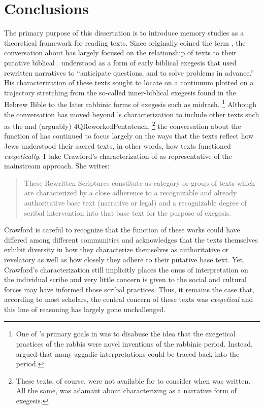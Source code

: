 
\chapter*{Conclusions}


The primary purpose of this dissertation is to introduce memory studies as a theoretical framework for reading \rwb texts. Since \Vermes originally coined the term \rwb, the conversation about \rwb has largely focused on the relationship of \rwb texts to their putative biblical \vorlagen. \vermes understood \rwb as a form of early biblical exegesis that used rewritten narratives to ``anticipate questions, and to solve problems in advance.''%
    \autocite[95]{vermes1961}
His characterization of these texts sought to locate \rwb on a continuum plotted on a trajectory stretching from the so-called inner-biblical exegesis found in the Hebrew Bible to the later rabbinic forms of exegesis such as midrash.%
    \footnote{One of \vermes's primary goals in  was to disabuse the idea that the exegetical practices of the rabbis were novel inventions of the rabbinic period. Instead, \vermes argued that many aggadic interpretations could be traced back into the \secondtemple period.}
Although the conversation has moved beyond \vermes's characterization to include other texts such as the \templescroll and (arguably) 4QReworkedPentateuch,%
    \footnote{These texts, of course, were not available for \vermes to consider when  was written. All the same, \vermes was adamant about characterizing \rwb as a narrative form of exegesis.}    
the conversation about the function of \rwb has continued to focus largely on the ways that the \rwb texts reflect how \secondtemple Jews understood their sacred texts, in other words, how \rwb texts functioned \emph{exegetically}. I take Crawford's characterization of  \rwb as representative of the mainstream approach. She writes:
\begin{quote}
    These Rewritten Scriptures constitute as category or group of texts which are characterized by a close adherence to a recognizable and already authoritative base text (narrative or legal) and a recognizable degree of scribal intervention into that base text for the purpose of exegesis.\autocite[12--13]{crawford2008}
\end{quote}
\noindent
Crawford is careful to recognize that the function of these works could have differed among different communities and acknowledges that the texts themselves exhibit diversity in how they characterize themselves as authoritative or revelatory as well as how closely they adhere to their putative base text.%
    \autocite[13]{crawford2008}
Yet, Crawford's characterization still implicitly places the onus of interpretation on the individual scribe and very little concern is given to the social and cultural forces may have informed those scribal practices. Thus, it remains the case that, according to most scholars, the central concern of these texts was \emph{exegetical} and this line of reasoning has largely gone unchallenged. 

